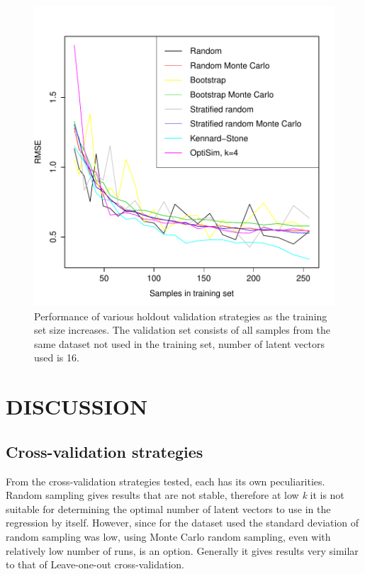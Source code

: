 \documentclass{isprs}
\begin{document}
\begin{figure}[ht!]
\includegraphics[width=1.0\columnwidth]{../script/output/rmse-nl-16.pdf}
\begin{center}
    \caption{Performance of various holdout validation strategies as the training set size increases. The validation set consists of all samples from the same dataset not used in the training set, number of latent vectors used is 16.}
    \label{fig:rmse-nl-16}
\end{center}
\end{figure}

\section{DISCUSSION}\label{sec:DISCUSSION}

\subsection{Cross-validation strategies}\label{sec:Cross-validation strategies 3}

From the cross-validation strategies tested, each has its own peculiarities. Random sampling gives results that are not stable, therefore at low \textit{k} it is not suitable for determining the optimal number of latent vectors to use in the regression by itself. However, since for the dataset used the standard deviation of random sampling was low, using Monte Carlo random sampling, even with relatively low number of runs, is an option. Generally it gives results very similar to that of Leave-one-out cross-validation.
\end{document}
